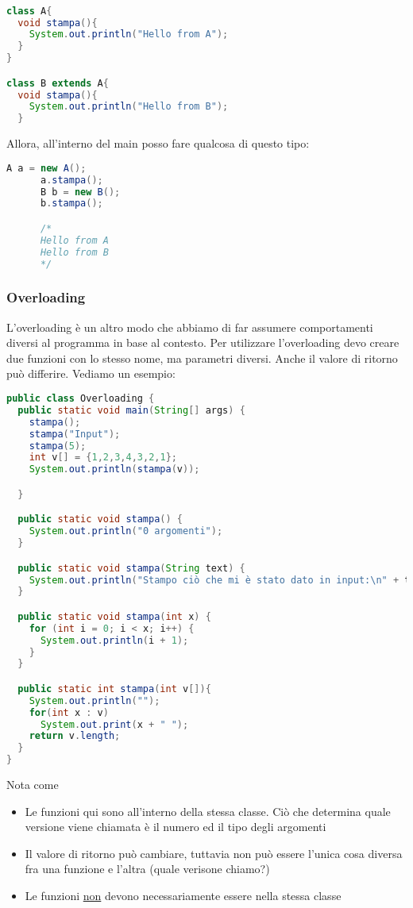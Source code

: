 \begin{lstlisting}[language = java, frame = none]

class A{
  void stampa(){
    System.out.println("Hello from A");
  }
}

class B extends A{
  void stampa(){
    System.out.println("Hello from B");
  }


\end{lstlisting}
\vskip3mm
Allora, all'interno del main posso fare qualcosa di questo tipo:
\vskip3mm
\begin{lstlisting}[language = java, frame = none]
      A a = new A();
      a.stampa();
      B b = new B();
      b.stampa();

      /*
      Hello from A
      Hello from B
      */
\end{lstlisting}

\subsubsection{Overloading}
L'overloading è un altro modo che abbiamo di far assumere comportamenti diversi al programma in base al contesto. Per utilizzare l'overloading devo creare due funzioni con lo stesso nome, ma parametri diversi. Anche il valore di ritorno può differire. Vediamo un esempio:
\vskip3mm

\begin{lstlisting}[language = java, frame = none]
public class Overloading {
  public static void main(String[] args) {
    stampa();
    stampa("Input");
    stampa(5);
    int v[] = {1,2,3,4,3,2,1};
    System.out.println(stampa(v));

  }

  public static void stampa() {
    System.out.println("0 argomenti");
  }

  public static void stampa(String text) {
    System.out.println("Stampo ciò che mi è stato dato in input:\n" + text + "\n");
  }

  public static void stampa(int x) {
    for (int i = 0; i < x; i++) {
      System.out.println(i + 1);
    }
  }

  public static int stampa(int v[]){
    System.out.println("");
    for(int x : v)
      System.out.print(x + " ");
    return v.length;
  }
}
\end{lstlisting}
\vskip3mm
Nota come
\begin{itemize}
	\item Le funzioni qui sono all'interno della stessa classe. Ciò che determina quale versione viene chiamata è il numero ed il tipo degli argomenti
	\item Il valore di ritorno può cambiare, tuttavia non può essere l'unica cosa diversa fra una funzione e l'altra (quale verisone chiamo?)
	\item Le funzioni \underline{non} devono necessariamente essere nella stessa classe
\end{itemize}
